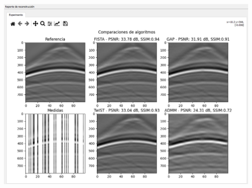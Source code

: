 \documentclass[12pt,twoside,letter]{ol-softwaremanual}
\newenvironment{Figure}
  {\par\medskip\noindent\minipage{\linewidth}}
  {\endminipage\par\medskip}
\begin{document}
\begin{enumerate}
	\begin{Figure}
		\centering
		\includegraphics[width=0.9\linewidth]{result-comp2.png}
		\label{fig:result-comp2}
	\end{Figure}

\end{enumerate}
\end{document}
